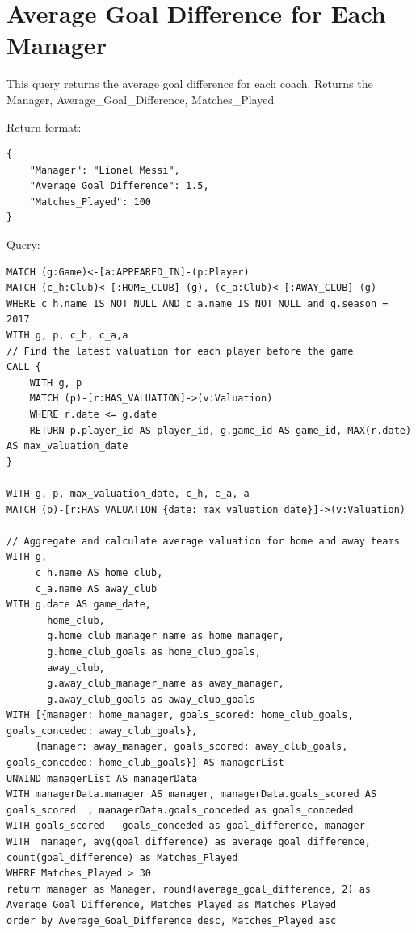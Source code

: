 \documentclass{Configuration_Files/PoliMi3i_thesis}
\begin{document}
\section{Average Goal Difference for Each Manager}
This query returns the average goal difference for each coach.
Returns the Manager, Average\_Goal\_Difference, Matches\_Played


Return format:
\begin{lstlisting}[style=json]
{
    "Manager": "Lionel Messi",
    "Average_Goal_Difference": 1.5,
    "Matches_Played": 100
}
\end{lstlisting}


Query:

\begin{lstlisting}[language=Cypher]
MATCH (g:Game)<-[a:APPEARED_IN]-(p:Player)
MATCH (c_h:Club)<-[:HOME_CLUB]-(g), (c_a:Club)<-[:AWAY_CLUB]-(g)
WHERE c_h.name IS NOT NULL AND c_a.name IS NOT NULL and g.season = 2017
WITH g, p, c_h, c_a,a
// Find the latest valuation for each player before the game
CALL {
    WITH g, p
    MATCH (p)-[r:HAS_VALUATION]->(v:Valuation)
    WHERE r.date <= g.date
    RETURN p.player_id AS player_id, g.game_id AS game_id, MAX(r.date) AS max_valuation_date
}

WITH g, p, max_valuation_date, c_h, c_a, a
MATCH (p)-[r:HAS_VALUATION {date: max_valuation_date}]->(v:Valuation)

// Aggregate and calculate average valuation for home and away teams
WITH g, 
     c_h.name AS home_club, 
     c_a.name AS away_club
WITH g.date AS game_date, 
       home_club, 
       g.home_club_manager_name as home_manager,
       g.home_club_goals as home_club_goals,
       away_club, 
       g.away_club_manager_name as away_manager,
       g.away_club_goals as away_club_goals
WITH [{manager: home_manager, goals_scored: home_club_goals, goals_conceded: away_club_goals}, 
     {manager: away_manager, goals_scored: away_club_goals, goals_conceded: home_club_goals}] AS managerList
UNWIND managerList AS managerData
WITH managerData.manager AS manager, managerData.goals_scored AS goals_scored  , managerData.goals_conceded as goals_conceded
WITH goals_scored - goals_conceded as goal_difference, manager
WITH  manager, avg(goal_difference) as average_goal_difference, count(goal_difference) as Matches_Played
WHERE Matches_Played > 30
return manager as Manager, round(average_goal_difference, 2) as Average_Goal_Difference, Matches_Played as Matches_Played
order by Average_Goal_Difference desc, Matches_Played asc
\end{lstlisting}
\end{document}
